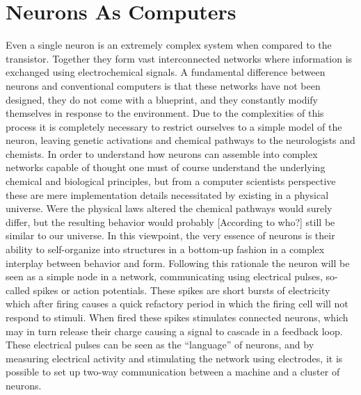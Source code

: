 \section{Neurons As Computers}
Even a single neuron is an extremely complex system when compared to the
transistor. Together they form vast interconnected networks where information is
exchanged using electrochemical signals. A fundamental difference between
neurons and conventional computers is that these networks have not been
designed, they do not come with a blueprint, and they constantly modify
themselves in response to the environment. Due to the complexities of this
process it is completely necessary to restrict ourselves to a simple model of
the neuron, leaving genetic activations and chemical pathways to the
neurologists and chemists. In order to understand how neurons can assemble into
complex networks capable of thought one must of course understand the underlying
chemical and biological principles, but from a computer scientists perspective
these are mere implementation details necessitated by existing in a physical
universe. Were the physical laws altered the chemical pathways would surely
differ, but the resulting behavior would probably [According to who?] still be
similar to our universe. In this viewpoint, the very essence of neurons is their
ability to self-organize into structures in a bottom-up fashion in a complex
interplay between behavior and form. Following this rationale the neuron will be
seen as a simple node in a network, communicating using electrical pulses,
so-called spikes or action potentials. These spikes are short bursts of
electricity which after firing causes a quick refactory period in which the
firing cell will not respond to stimuli.
When fired these spikes stimulates connected neurons, which may in turn
release their charge causing a signal to cascade in a feedback loop.
These electrical pulses can be seen as the ``language'' of neurons, and by
measuring electrical activity and stimulating the network using electrodes, it
is possible to set up two-way communication between a machine and a cluster of
neurons.

\section{}
\cleardoublepage

